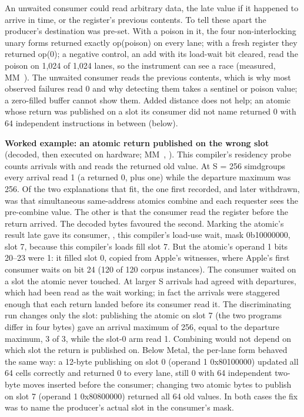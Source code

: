 An unwaited consumer could read arbitrary data, the late value if it happened to arrive in time, or the register's
previous contents. To tell these apart the producer's destination was pre-set. With a poison in it, the
four non-interlocking unary forms returned exactly op(poison) on every lane; with a fresh register they returned op(0); a
negative control, an add with its load-wait bit cleared, read the poison on 1,024 of 1,024 lanes, so the instrument can
see a race (measured, MM~). The unwaited consumer reads the previous contents, which is why most observed
failures read 0 and why detecting them takes a sentinel or poison value; a zero-filled buffer cannot show them. Added
distance does not help; an atomic whose return was published on a slot its consumer did not name returned 0 with
64 independent instructions in between (below).

\textbf{Worked example: an atomic return published on the wrong slot} (decoded, then executed on hardware; MM~,
). This compiler's residency probe counts arrivals with  and reads the returned old value. At S = 256 simdgroups every arrival read 1 (a returned 0, plus
one) while the departure maximum was 256. Of the two explanations that fit, the one first recorded, and later withdrawn, was that
simultaneous same-address atomics combine and each requester sees the pre-combine value. The other is that the consumer
read the register before the return arrived. The decoded bytes favoured the second. Marking the atomic's result late
gave its consumer, , this compiler's load-use wait, mask 0b10000000, slot 7, because this
compiler's loads fill slot 7. But the atomic's operand 1 bits 20–23 were 1: it filled slot 0, copied from Apple's
witnesses, where Apple's first consumer waits on bit 24 (120 of 120 corpus instances). The consumer waited on a slot the
atomic never touched. At larger S arrivals had agreed with departures, which had been read as the wait working; in fact
the arrivals were staggered enough that each return landed before its consumer read it. The discriminating run changes only the slot: publishing the atomic on slot 7
(the two programs differ in four bytes) gave an arrival maximum of 256, equal to the departure maximum, 3 of 3, while the
slot-0 arm read 1. Combining would not depend on which slot the return is published on. Below Metal, the per-lane form behaved the same way: a 12-byte 
publishing on slot 0 (operand 1 0x80100000) updated all 64 cells correctly and returned 0 to every lane, still 0 with 64
independent two-byte moves inserted before the consumer; changing two atomic bytes to publish on slot 7 (operand 1
0x80800000) returned all 64 old values. In both cases the fix was to name the producer's actual slot in the consumer's
mask.

